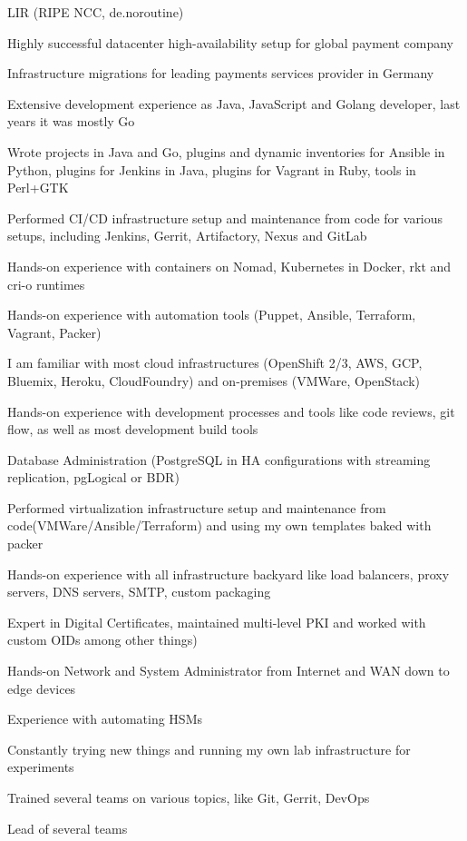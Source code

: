 \documentclass[letterpaper,11pt]{article}
\begin{document}
	LIR (RIPE NCC, de.noroutine)
	
	Highly successful datacenter high-availability setup for global payment company
	
	Infrastructure migrations for leading payments services provider in Germany
	
	Extensive development experience as Java, JavaScript and Golang developer, last years it was mostly Go
		
	Wrote projects in Java and Go, plugins and dynamic inventories for Ansible in Python, plugins for Jenkins in Java, plugins for Vagrant in Ruby, tools in Perl+GTK
	
	Performed CI/CD infrastructure setup and maintenance from code for various setups, including Jenkins, Gerrit, Artifactory, Nexus and GitLab
	
	Hands-on experience with containers on Nomad, Kubernetes in Docker, rkt and cri-o runtimes
	
	Hands-on experience with automation tools (Puppet, Ansible, Terraform, Vagrant, Packer)
	
	I am familiar with most cloud infrastructures (OpenShift 2/3, AWS, GCP, Bluemix, Heroku, CloudFoundry) and on-premises (VMWare, OpenStack)
	
	Hands-on experience with development processes and tools like code reviews, git flow, as well as most development build tools
	
	Database Administration (PostgreSQL in HA configurations with streaming replication, pgLogical or BDR)
	
	Performed virtualization infrastructure setup and maintenance from code(VMWare/Ansible/Terraform) and using my own templates baked with packer
		
	Hands-on experience with all infrastructure backyard like load balancers, proxy servers, DNS servers, SMTP, custom packaging
	
	Expert in Digital Certificates, maintained multi-level PKI and worked with custom OIDs among other things)
	
	Hands-on Network and System Administrator from Internet and WAN down to edge devices
	
	Experience with automating HSMs

	Constantly trying new things and running my own lab infrastructure for experiments
	
	Trained several teams on various topics, like Git, Gerrit, DevOps
	
	Lead of several teams
	
\end{document}
